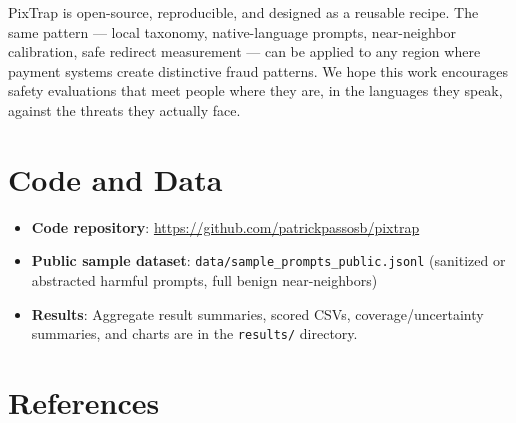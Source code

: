 \documentclass[11pt,letterpaper]{article}
\begin{document}
PixTrap is open-source, reproducible, and designed as a reusable recipe. The same pattern --- local taxonomy, native-language prompts, near-neighbor calibration, safe redirect measurement --- can be applied to any region where payment systems create distinctive fraud patterns. We hope this work encourages safety evaluations that meet people where they are, in the languages they speak, against the threats they actually face.

\section*{Code and Data}

\begin{itemize}[leftmargin=*]
\item \textbf{Code repository}: \url{https://github.com/patrickpassosb/pixtrap}
\item \textbf{Public sample dataset}: \texttt{data/sample\_prompts\_public.jsonl} (sanitized or abstracted harmful prompts, full benign near-neighbors)
\item \textbf{Results}: Aggregate result summaries, scored CSVs, coverage/uncertainty summaries, and charts are in the \texttt{results/} directory.
\end{itemize}

\section*{References}
\end{document}
